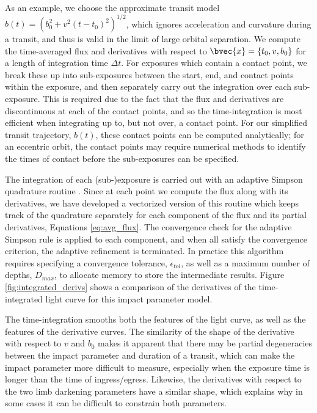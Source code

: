 \documentclass[modern,trackchanges]{aastex63}
\newcommand{\edited}{}
\begin{document}
As an example, we choose the approximate transit model $b(t) = (b_0^2 + v^2(t-t_0)^2)^{1/2}$,
which ignores acceleration and curvature during a transit, and thus is valid in the
limit of large orbital separation.  We compute the time-averaged flux and derivatives
with respect to $\bvec{x} = \{t_0,v,b_0\}$ for a length of integration time $\Delta t$.
{\edited For exposures which contain a contact point, we break these up into sub-exposures
between the start, end, and contact points within the exposure, and then separately
carry out the integration over each sub-exposure.  This is required due to the fact
that the flux and derivatives are discontinuous at each of the contact points, and
so the time-integration is most efficient when integrating up to, but not over,
a contact point.  For our simplified transit trajectory, $b(t)$, these contact points
can be computed analytically;  for an eccentric orbit, the contact points may require
numerical methods to identify the times of contact before the sub-exposures can be specified.}

The integration {\edited of each (sub-)exposure} is carried out with an adaptive Simpson 
quadrature routine \citep{Kuncir1962}.  Since at each point we compute the flux along with
its derivatives, we have developed a vectorized version of this routine
which keeps track of the quadrature separately for each component of the
flux and its partial derivatives, Equations \ref{eq:avg_flux}.  The convergence check for the adaptive
Simpson rule is applied to each component, and when all satisfy the
convergence criterion, the adaptive refinement is terminated.
In practice this algorithm requires specifying a convergence tolerance,
$\epsilon_{tol}$, as well as a maximum number of depths, $D_{max}$, to
allocate memory to store the intermediate results.
Figure \ref{fig:integrated_derivs} shows a
comparison of the derivatives of the time-integrated light curve for this
impact parameter model.

The time-integration smooths both the features of
the light curve, as well as the features of the derivative curves.  The similarity of
the shape of the derivative with respect to $v$ and $b_0$ makes it apparent
that there may be partial degeneracies between the impact parameter and duration
of a transit, which can make the impact parameter more difficult to measure, especially
when the exposure time is longer than the time of ingress/egress.  Likewise, the
derivatives with respect to the two limb darkening parameters have a similar shape,
which explains why in some cases it can be difficult to constrain both parameters.
\end{document}
